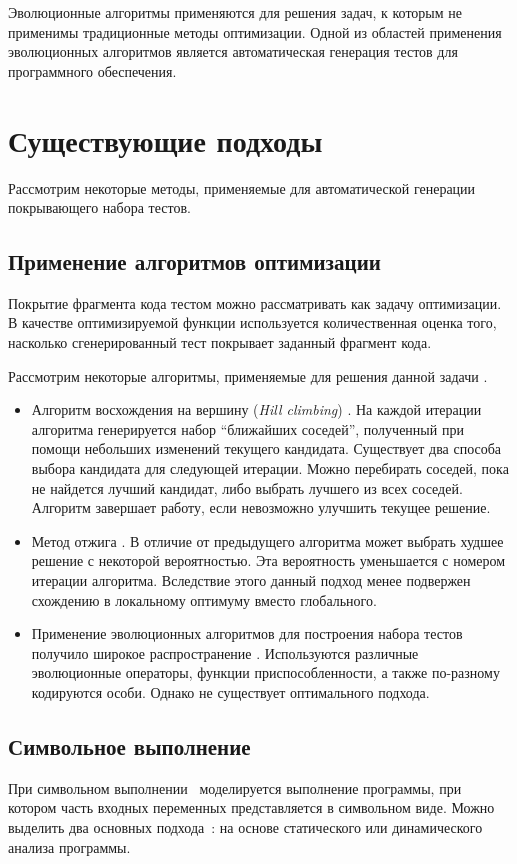 Эволюционные алгоритмы применяются для решения задач, к которым не применимы традиционные методы оптимизации. Одной из областей применения эволюционных 
алгоритмов является автоматическая генерация тестов для программного обеспечения.

\section{Существующие подходы}
Рассмотрим некоторые методы, применяемые для автоматической генерации покрывающего набора тестов.

\subsection{Применение алгоритмов оптимизации}
Покрытие фрагмента кода тестом можно рассматривать как задачу оптимизации. В качестве оптимизируемой функции используется количественная оценка того, насколько 
сгенерированный тест покрывает заданный фрагмент кода.

Рассмотрим некоторые алгоритмы, применяемые для решения данной задачи \cite{review_harman,sbst}.
\begin{itemize}
 \item Алгоритм восхождения на вершину (\textit{Hill climbing}) \cite{hill_climbing_harman}. На каждой итерации алгоритма генерируется 
набор ``ближайших соседей'', полученный при помощи небольших изменений текущего кандидата. Существует два способа выбора кандидата для следующей итерации. Можно 
перебирать соседей, пока не найдется лучший кандидат, либо выбрать лучшего из всех соседей. Алгоритм завершает работу, если невозможно улучшить текущее 
решение. 
 \item Метод отжига \cite{SA}. В отличие от предыдущего алгоритма может выбрать худшее решение с некоторой вероятностью. Эта вероятность уменьшается с номером 
итерации алгоритма. Вследствие этого данный подход менее подвержен схождению в локальному оптимуму вместо глобального.

 \item Применение эволюционных алгоритмов для построения набора тестов получило широкое распространение 
\cite{evolutionary_tonella,whole_test_suite_generation,structural_test_data_generation}. Используются различные эволюционные операторы, функции 
приспособленности, а также по-разному кодируются особи. Однако не существует оптимального подхода.
\end{itemize}

\subsection{Символьное выполнение}
При символьном выполнении~\cite{symbolic_sbst} моделируется выполнение программы, при котором часть входных переменных представляется в символьном виде. Можно 
выделить два основных подхода~\cite{symbolic_execution}: на основе статического или динамического анализа программы.

